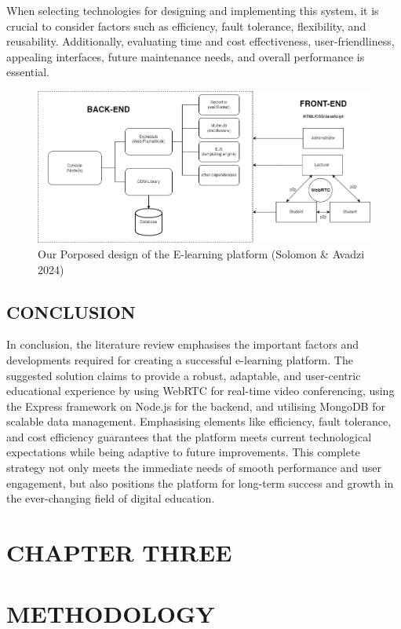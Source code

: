 \documentclass[a4paper,12pt]{article}  %
\begin{document}
When selecting technologies for designing and implementing this system, it is
crucial to consider factors such as efficiency, fault tolerance, flexibility,
and reusability. Additionally, evaluating time and cost effectiveness,
user-friendliness, appealing interfaces, future maintenance needs, and overall
performance is essential.\\

\begin{figure}[H]
      \centering
      \includegraphics[width=1\textwidth]{figures/proposed.png}
      \caption{Our Porposed design of the E-learning platform (Solomon \& Avadzi 2024)}
\end{figure}

\subsection{CONCLUSION}
In conclusion, the literature review emphasises the important factors and
developments required for creating a successful e-learning platform. The
suggested solution claims to provide a robust, adaptable, and user-centric
educational experience by using WebRTC for real-time video conferencing, using
the Express framework on Node.js for the backend, and utilising MongoDB for
scalable data management. Emphasising elements like efficiency, fault
tolerance, and cost efficiency guarantees that the platform meets current
technological expectations while being adaptive to future improvements. This
complete strategy not only meets the immediate needs of smooth performance and
user engagement, but also positions the platform for long-term success and
growth in the ever-changing field of digital education.\\ \newpage

\begin{center}
      \section*{CHAPTER THREE}
      \section{METHODOLOGY}
\end{center}
\end{document}
